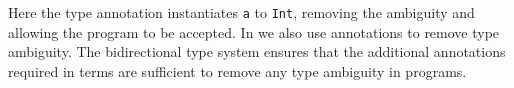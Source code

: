 \noindent Here the type annotation instantiates \verb|a| 
to \verb|Int|, removing the ambiguity and allowing the program to 
be accepted. In \name we also use annotations to remove type
ambiguity. The bidirectional type system ensures that the additional 
annotations required in terms are sufficient to remove any type
ambiguity in \name programs.

\begin{comment}
\paragraph{Traits and Trait Calculi.}

The seminal paper by Schärli~\textit{et al.} introduced the ideas behind
traits. In their original paper, they documented an implementation of
the trait mechanism in a dynamically typed version of Smalltalk.
Fisher and Reppy~\cite{fisher2004typed} presented a statically typed
calculus that models traits. \name is not dedicated to traits; but rather, it
supports a source language that models traits. Compared to Fisher and Reppy's
calculus, \name is more lightweight. For example, self references (as
well as other OO-specific constructs) are
not built-in \name. One reason for the difference is that Fisher and Reppy's
calculus supports \emph{classes} in addition to traits, and considers the
interaction between them, whereas our object oriented source language is
\emph{prototype} (or delegation) based---the mechanism for code reuse is purely traits. Of
course, there have been many other formalizations of traits, such
as~\cite{scharli2003traitsformal}. But most of them are heavyweight and specific
to modeling traits and typical class-based models of OOP, and therefore differ from our approach.

Bettini~\textit{et al.}'s prototype language,
SWRTJ~\cite{bettini2010prototypical} distinguishes, in their terminology,
``records'' and ``traits''---the former contain fields and the latter contain
methods. Since we try to model a pure object-oriented language, we have excluded
fields, which provide state reuse. In SWRTJ, traits themselves are not meant to
be the generator of instances. Instead, another construct, called ``classes''
are, and make use of traits.

The Scala language also has a notion of ``traits''. However, unlike what its
name suggests,
the semantics of trait composition in Scala is more similar to
mixins~\cite{bracha1990mixin}. That is, like traditional mixin
semantics, when two traits are composed, Scala attempts to do
\emph{implicit resolution of conflicts}. In comparison, the traits modeled in
\name are
intended to model the original trait idea closely, and conflicts must
be resolved explicitly. Schärli~\textit{et al.} document well the trade-offs
between mixins and traits. Aside from that, Scala's
traits and our source language's traits have four major differences:


\end{comment}

